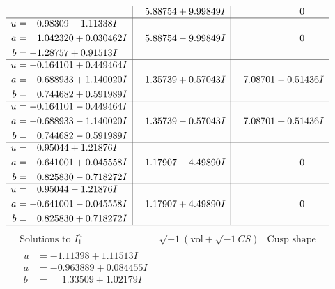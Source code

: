 \documentclass[1p]{elsarticle_modified}
\theoremstyle{definition}
\newcommand{\I}{\sqrt{-1}}
\begin{document}
$$\begin{array}{c|c|c}
 & \phantom{-}5.88754 + 9.99849 I & \phantom{-0.000000 } 0 \\ \hline\begin{aligned}
u &= -0.98309 - 1.11338 I \\
a &= \phantom{-}1.042320 + 0.030462 I \\
b &= -1.28757 + 0.91513 I\end{aligned}
 & \phantom{-}5.88754 - 9.99849 I & \phantom{-0.000000 } 0 \\ \hline\begin{aligned}
u &= -0.164101 + 0.449464 I \\
a &= -0.688933 + 1.140020 I \\
b &= \phantom{-}0.744682 + 0.591989 I\end{aligned}
 & \phantom{-}1.35739 + 0.57043 I & \phantom{-}7.08701 - 0.51436 I \\ \hline\begin{aligned}
u &= -0.164101 - 0.449464 I \\
a &= -0.688933 - 1.140020 I \\
b &= \phantom{-}0.744682 - 0.591989 I\end{aligned}
 & \phantom{-}1.35739 - 0.57043 I & \phantom{-}7.08701 + 0.51436 I \\ \hline\begin{aligned}
u &= \phantom{-}0.95044 + 1.21876 I \\
a &= -0.641001 + 0.045558 I \\
b &= \phantom{-}0.825830 - 0.718272 I\end{aligned}
 & \phantom{-}1.17907 - 4.49890 I & \phantom{-0.000000 } 0 \\ \hline\begin{aligned}
u &= \phantom{-}0.95044 - 1.21876 I \\
a &= -0.641001 - 0.045558 I \\
b &= \phantom{-}0.825830 + 0.718272 I\end{aligned}
 & \phantom{-}1.17907 + 4.49890 I & \phantom{-0.000000 } 0\\
 \hline 
 \end{array}$$\newpage$$\begin{array}{c|c|c}  
\text{Solutions to }I^u_{1}& \I (\text{vol} + \sqrt{-1}CS) & \text{Cusp shape}\\
 \hline 
\begin{aligned}
u &= -1.11398 + 1.11513 I \\
a &= -0.963889 + 0.084455 I \\
b &= \phantom{-}1.33509 + 1.02179 I\end{aligned}

\end{array}$$
\end{document}
